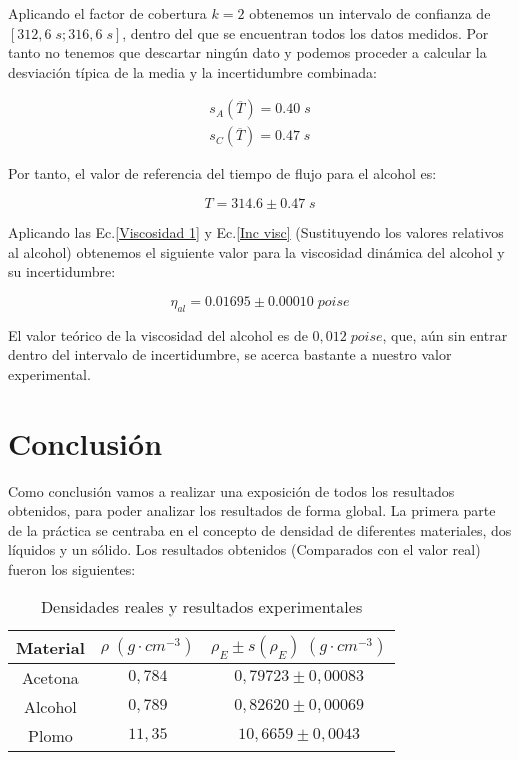 \documentclass[a4paper,12pt,titlepage]{article}
\begin{document}
Aplicando el factor de cobertura $k=2$ obtenemos un intervalo de confianza de $[312,6 \;s;316,6\; s]$, dentro del que se encuentran todos los datos medidos. Por tanto no tenemos que descartar ningún dato y podemos proceder a calcular la desviación típica de la media y la incertidumbre combinada:

\begin{equation}
    \begin{gathered}
        s_A(\overline{T}) = 0.40 \; s \\
        s_C(\overline{T}) = 0.47 \; s
    \end{gathered}
\end{equation}

Por tanto, el valor de referencia del tiempo de flujo para el alcohol es:

\begin{equation}
    T = 314.6 \pm 0.47 \; s
\end{equation}

Aplicando las Ec.\ref{Viscosidad 1} y Ec.\ref{Inc visc} (Sustituyendo los valores relativos al alcohol) obtenemos el siguiente valor para la viscosidad dinámica del alcohol y su incertidumbre:

\begin{equation}
    \eta_{al} =  0.01695 \pm 0.00010 \; poise
\end{equation}

El valor teórico de la viscosidad del alcohol es de $0,012 \; poise$, que, aún sin entrar dentro del intervalo de incertidumbre, se acerca bastante a nuestro valor experimental.

\section{Conclusión}

Como conclusión vamos a realizar una exposición de todos los resultados obtenidos, para poder analizar los resultados de forma global. La primera parte de la práctica se centraba en el concepto de densidad de diferentes materiales, dos líquidos y un sólido. Los resultados obtenidos (Comparados con el valor real) fueron los siguientes:


\begin{table}[h!]
    \centering
    \begin{tabular}{|c|c|c|}
        \hline
        Material & $\rho  \; (g \cdot cm^{-3})$ & $\rho _E\pm s(\rho_E) \; (g \cdot cm^{-3})$ \\ \hline
        Acetona &$0, 784$ & $0,79723 \pm 0,00083$ \\ \hline
        Alcohol & $0, 789$ & $0,82620 \pm  0,00069$\\ \hline
        Plomo & $11,35$ & $10,6659 \pm 0,0043$ \\ \hline
    \end{tabular}
    \caption{Densidades reales y resultados experimentales}
\end{table}
\end{document}

